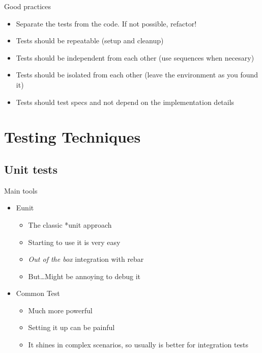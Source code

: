 \documentclass[]{beamer}
\begin{document}
\begin{frame}{Good practices}
    \begin{itemize}
    \item Separate the tests from the code. If not possible, refactor!
    \pause
    \item Tests should be repeatable (setup and cleanup)
    \pause
    \item Tests should be independent from each other (use sequences when necesary)
    \pause
    \item Tests should be isolated from each other (leave the environment as you found it)
    \pause
    \item Tests should test specs and not depend on the implementation details
    \end{itemize}
\end{frame}

\section{Testing Techniques}

\subsection*{Unit tests}
\label{unit_testing}

\begin{frame}{Main tools}
    \begin{itemize}
    \item Eunit
        \begin{itemize}
        \item The classic *unit approach
        \pause
        \item Starting to use it is very easy
        \pause
        \item \emph{Out of the box} integration with rebar
        \pause
        \item But\dots Might be annoying to debug it
        \end{itemize}
    \pause
    \item Common Test
        \begin{itemize}
        \item Much more powerful
        \pause
        \item Setting it up can be painful
        \pause
        \item It shines in complex scenarios, so usually is better for integration tests
        \end{itemize}
    \end{itemize}
\end{frame}
\end{document}
